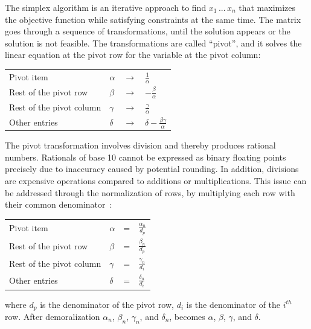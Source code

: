 \documentclass[logo,bsc,singlespacing,parskip]{infthesis}
\begin{document}
The simplex algorithm is an iterative approach to find \begin{math} x_1 \, ...
\, x_n\end{math} that maximizes the objective function while satisfying
constraints at the same time. The matrix goes through a sequence of
transformations, until the solution appears or the solution is not feasible. The
transformations are called ``pivot'', and it solves the linear equation at the pivot
row for the variable at the pivot column: 
\vspace*{-4mm}
\begin{table}[H]
\begin{center}
\begin{tabular}{llll}
Pivot item           & $\alpha$ & $\rightarrow$ & $\frac{1}{\alpha}$            \\
Rest of the pivot row    & $\beta$  & $\rightarrow$ & $-\frac{\beta}{\alpha}$            \\
Rest of the pivot column& $\gamma$ & $\rightarrow$ & $\frac{\gamma}{\alpha}$            \\
Other entries         & $\delta$ & $\rightarrow$ & $\delta - \frac{\beta\gamma}{\alpha}$  
\end{tabular}
\end{center}
\end{table}
\vspace*{-8mm}

The pivot transformation involves division and thereby produces rational
numbers. Rationals of base 10 cannot be expressed as binary floating points
precisely due to inaccuracy caused by potential rounding. In addition, divisions
are expensive operations compared to additions or multiplications. This issue
can be addressed through the normalization of rows, by multiplying each row with
their common denominator~\cite{FPL1}: 
\vspace*{-4mm}
\begin{table}[H]
\begin{center}
\begin{tabular}{llll}
Pivot item           & $\alpha$ & = & $\frac{\alpha_n}{d_p}$            \\
Rest of the pivot row    & $\beta$  & = & $\frac{\beta_n}{d_p}$            \\
Rest of the pivot column& $\gamma$ & = & $\frac{\gamma_n}{d_i}$            \\
Other entries         & $\delta$ & = & $\frac{\delta_n}{d_i}$  
\end{tabular}
\end{center}
\end{table}
\vspace*{-8mm}
where $d_p$ is the denominator of the pivot row, $d_i$ is the denominator of the
$i^{th}$ row. After demoralization $\alpha_n$, $\beta_n$, $\gamma_n$, and
$\delta_n$, becomes $\alpha$, $\beta$, $\gamma$, and $\delta$.
\end{document}

